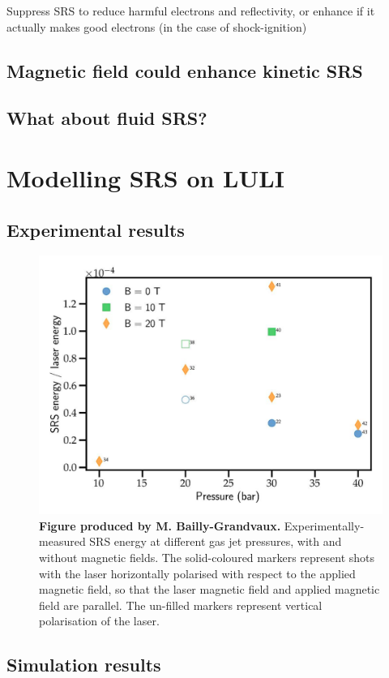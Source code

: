 Suppress SRS to reduce harmful electrons and reflectivity, or enhance if it actually makes good electrons (in the case of shock-ignition)

\subsection{Magnetic field could enhance kinetic SRS}

\subsection{What about fluid SRS?}

\section{Modelling SRS on LULI}
\subsection{Experimental results}
\begin{figure}[ht]
   \centering
    \includegraphics[width=0.8\columnwidth]{Chapters/C6_magSRS/SRS_LULI.png}
    \caption{\textbf{Figure produced by M. Bailly-Grandvaux.} Experimentally-measured SRS energy at different gas jet pressures, with and without magnetic fields. The solid-coloured markers represent shots with the laser  horizontally polarised with respect to the applied magnetic field, so that the laser magnetic field and applied magnetic field are parallel. The un-filled markers represent vertical polarisation of the laser.}
    \label{fig:SRS_LULI}
\end{figure}{}


\subsection{Simulation results}

